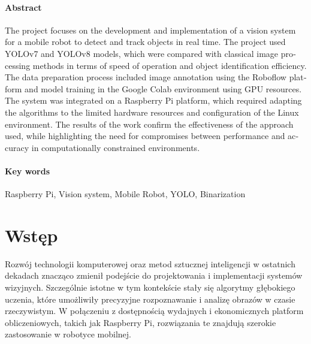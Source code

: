 \documentclass[a4paper,twoside,12pt]{book}
\newcounter{stronyPozaNumeracja}
\begin{document}
\subsubsection*{Abstract} 
\begin{otherlanguage}{british}
    The project focuses on the development and implementation of a vision system for a mobile robot to detect and track objects in real time. The project used YOLOv7 and YOLOv8 models, which were compared with classical image processing methods in terms of speed of operation and object identification efficiency. The data preparation process included image annotation using the Roboflow platform and model training in the Google Colab environment using GPU resources.
    The system was integrated on a Raspberry Pi platform, which required adapting the algorithms to the limited hardware resources and configuration of the Linux environment.
    The results of the work confirm the effectiveness of the approach used, while highlighting the need for compromises between performance and accuracy in computationally constrained environments.
\end{otherlanguage}
\subsubsection*{Key words}  
\begin{otherlanguage}{british}
Raspberry Pi, Vision system, Mobile Robot, YOLO, Binarization
\end{otherlanguage}




\tableofcontents

\setcounter{stronyPozaNumeracja}{\value{page}}
\mainmatter
\pagestyle{empty}

\cleardoublepage

\pagestyle{NumeryStronNazwyRozdzialow}


\chapter{Wstęp}
\label{ch:wstep}

Rozwój technologii komputerowej oraz metod sztucznej inteligencji w ostatnich dekadach znacząco zmienił podejście do projektowania i implementacji systemów wizyjnych. Szczególnie istotne w tym kontekście stały się algorytmy głębokiego uczenia, które umożliwiły precyzyjne rozpoznawanie i analizę obrazów w czasie rzeczywistym. W połączeniu z dostępnością wydajnych i ekonomicznych platform obliczeniowych, takich jak Raspberry Pi, rozwiązania te znajdują szerokie zastosowanie w robotyce mobilnej. 
\end{document}

